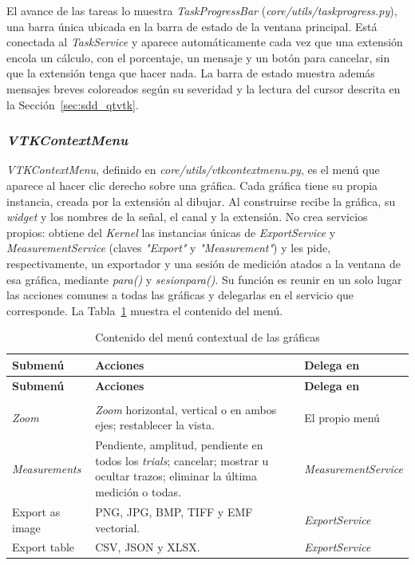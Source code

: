 \documentclass[12pt,letterpaper,oneside]{article}
\DeclareRobustCommand{\_}{\textunderscore\allowbreak}
\begin{document}
El avance de las tareas lo muestra \textit{TaskProgressBar} (\textit{core/utils/task\_progress.py}), una barra única ubicada en la barra de estado de la ventana principal. Está conectada al \textit{TaskService} y aparece automáticamente cada vez que una extensión encola un cálculo, con el porcentaje, un mensaje y un botón para cancelar, sin que la extensión tenga que hacer nada. La barra de estado muestra además mensajes breves coloreados según su severidad y la lectura del cursor descrita en la Sección~\ref{sec:sdd_qtvtk}.

\subsubsection{\textit{VTKContextMenu}}
\label{sec:sdd_contextmenu}

\textit{VTKContextMenu}, definido en \textit{core/utils/vtk\_context\_menu.py}, es el menú que aparece al hacer clic derecho sobre una gráfica. Cada gráfica tiene su propia instancia, creada por la extensión al dibujar. Al construirse recibe la gráfica, su \textit{widget} y los nombres de la señal, el canal y la extensión. No crea servicios propios: obtiene del \textit{Kernel} las instancias únicas de \textit{ExportService} y \textit{MeasurementService} (claves \textit{"Export"} y \textit{"Measurement"}) y les pide, respectivamente, un exportador y una sesión de medición atados a la ventana de esa gráfica, mediante \textit{para()} y \textit{sesion\_para()}. Su función es reunir en un solo lugar las acciones comunes a todas las gráficas y delegarlas en el servicio que corresponde. La Tabla~\ref{tab:sdd_contextmenu} muestra el contenido del menú.

\begin{center}
\small
\begin{longtable}{|p{}|p{}|p{}|}
\hline
\textbf{Submenú} & \textbf{Acciones} & \textbf{Delega en} \\
\hline
\endfirsthead
\hline
\textbf{Submenú} & \textbf{Acciones} & \textbf{Delega en} \\
\hline
\endhead
\hline
\endfoot
\hline
\caption{Contenido del menú contextual de las gráficas} \label{tab:sdd_contextmenu} \\
\endlastfoot
\textit{Zoom} & \textit{Zoom} horizontal, vertical o en ambos ejes; restablecer la vista. & El propio menú \\
\hline
\textit{Measurements} & Pendiente, amplitud, pendiente en todos los \textit{trials}; cancelar; mostrar u ocultar trazos; eliminar la última medición o todas. & \textit{Measurement\-Service} \\
\hline
Export as image & PNG, JPG, BMP, TIFF y EMF vectorial. & \textit{ExportService} \\
\hline
Export table & CSV, JSON y XLSX. & \textit{ExportService} \\
\hline
\end{longtable}
\end{center}
\end{document}
